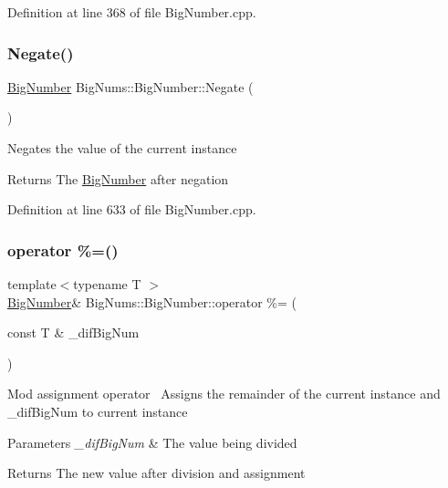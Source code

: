 Definition at line 368 of file Big\+Number.\+cpp.

\mbox{\label{class_big_nums_1_1_big_number_a9f52fbb5f431c7d6a82e40f34e5b1f6e}} 
\subsubsection{\texorpdfstring{Negate()}{Negate()}}
{\footnotesize\ttfamily \mbox{\hyperlink{class_big_nums_1_1_big_number}{Big\+Number}} Big\+Nums\+::\+Big\+Number\+::\+Negate (\begin{DoxyParamCaption}{ }\end{DoxyParamCaption})}

Negates the value of the current instance \begin{DoxyReturn}{Returns}
The \mbox{\hyperlink{class_big_nums_1_1_big_number}{Big\+Number}} after negation 
\end{DoxyReturn}


Definition at line 633 of file Big\+Number.\+cpp.

\mbox{\label{class_big_nums_1_1_big_number_a697d3b997151dcb9e0fe10e5ac44676a}} 
\subsubsection{\texorpdfstring{operator \%=()}{operator \%=()}}
{\footnotesize\ttfamily template$<$typename T $>$ \\
\mbox{\hyperlink{class_big_nums_1_1_big_number}{Big\+Number}}\& Big\+Nums\+::\+Big\+Number\+::operator \%= (\begin{DoxyParamCaption}\item[{const T \&}]{\+\_\+dif\+Big\+Num }\end{DoxyParamCaption})\hspace{0.3cm}{\ttfamily [inline]}}

Mod assignment operator~\newline
Assigns the remainder of the current instance and \+\_\+dif\+Big\+Num to current instance 
\begin{DoxyParams}{Parameters}
{\em \+\_\+dif\+Big\+Num} & The value being divided \\
\hline
\end{DoxyParams}
\begin{DoxyReturn}{Returns}
The new value after division and assignment 
\end{DoxyReturn}


